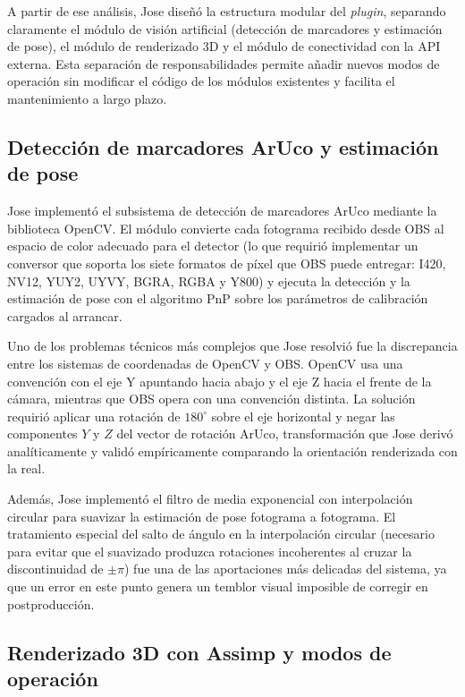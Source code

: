 A partir de ese análisis, Jose diseñó la estructura modular del \textit{plugin}, separando claramente el módulo de visión artificial (detección de marcadores y estimación de pose), el módulo de renderizado 3D y el módulo de conectividad con la API externa. Esta separación de responsabilidades permite añadir nuevos modos de operación sin modificar el código de los módulos existentes y facilita el mantenimiento a largo plazo.


\subsection*{Detección de marcadores ArUco y estimación de pose}

Jose implementó el subsistema de detección de marcadores ArUco mediante la biblioteca OpenCV. El módulo convierte cada fotograma recibido desde OBS al espacio de color adecuado para el detector (lo que requirió implementar un conversor que soporta los siete formatos de píxel que OBS puede entregar: I420, NV12, YUY2, UYVY, BGRA, RGBA y Y800) y ejecuta la detección y la estimación de pose con el algoritmo PnP sobre los parámetros de calibración cargados al arrancar.

Uno de los problemas técnicos más complejos que Jose resolvió fue la discrepancia entre los sistemas de coordenadas de OpenCV y OBS. OpenCV usa una convención con el eje Y apuntando hacia abajo y el eje Z hacia el frente de la cámara, mientras que OBS opera con una convención distinta. La solución requirió aplicar una rotación de $180^\circ$ sobre el eje horizontal y negar las componentes $Y$ y $Z$ del vector de rotación ArUco, transformación que Jose derivó analíticamente y validó empíricamente comparando la orientación renderizada con la real.

Además, Jose implementó el filtro de media exponencial con interpolación circular para suavizar la estimación de pose fotograma a fotograma. El tratamiento especial del salto de ángulo en la interpolación circular (necesario para evitar que el suavizado produzca rotaciones incoherentes al cruzar la discontinuidad de $\pm\pi$) fue una de las aportaciones más delicadas del sistema, ya que un error en este punto genera un temblor visual imposible de corregir en postproducción.

\subsection*{Renderizado 3D con Assimp y modos de operación}

